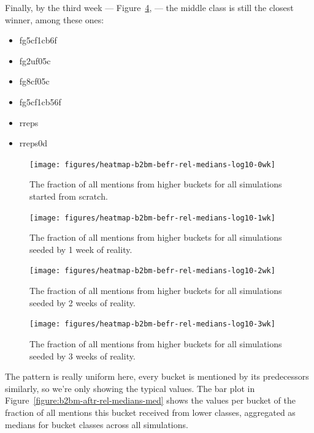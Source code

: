 \documentclass[10pt,oneside]{memoir}
\begin{document}
Finally, by the third week --- Figure~\ref{figure:heatmap-b2bm-befr-rel-medians-3wk}, ---  the middle class is still the closest winner, among these ones:


\begin{itemize}


\item fg5cf1cb6f

\item fg2uf05c

\item fg8cf05c

\item fg5cf1cb56f

\item rreps

\item rreps0d
\end{itemize}


\begin{figure}
\begin{center}
    \texttt{[image: figures/heatmap-b2bm-befr-rel-medians-log10-0wk]}
    \caption{The fraction of all mentions from higher buckets for all simulations started from scratch.}
    \label{figure:heatmap-b2bm-befr-rel-medians-0wk}
\end{center}
\end{figure}

\begin{figure}
\begin{center}
    \texttt{[image: figures/heatmap-b2bm-befr-rel-medians-log10-1wk]}
    \caption{The fraction of all mentions from higher buckets for all simulations seeded by 1 week of reality.}
    \label{figure:heatmap-b2bm-befr-rel-medians-1wk}
\end{center}
\end{figure}

\begin{figure}
\begin{center}
    \texttt{[image: figures/heatmap-b2bm-befr-rel-medians-log10-2wk]}
    \caption{The fraction of all mentions from higher buckets for all simulations seeded by 2 weeks of reality.}
    \label{figure:heatmap-b2bm-befr-rel-medians-2wk}
\end{center}
\end{figure}

\begin{figure}
\begin{center}
    \texttt{[image: figures/heatmap-b2bm-befr-rel-medians-log10-3wk]}
    \caption{The fraction of all mentions from higher buckets for all simulations seeded by 3 weeks of reality.}
    \label{figure:heatmap-b2bm-befr-rel-medians-3wk}
\end{center}
\end{figure}
The pattern is really uniform here, every bucket is mentioned by its predecessors similarly, so we're only showing the typical values.  The bar plot in Figure~\ref{figure:b2bm-aftr-rel-medians-med} shows the values per bucket of the fraction of all mentions this bucket received from lower classes, aggregated as medians for bucket classes across all simulations.
\end{document}

